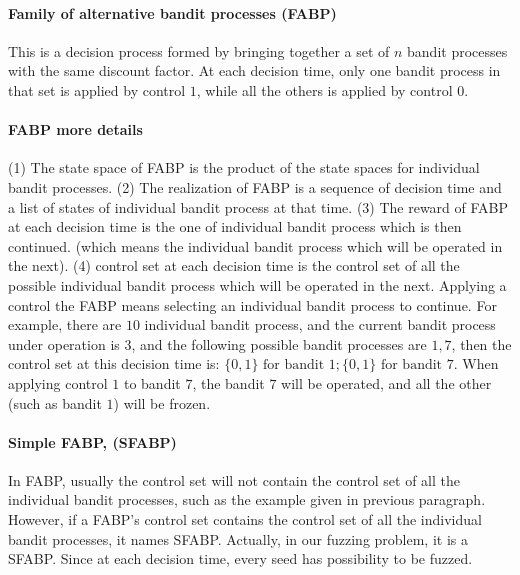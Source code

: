 \paragraph{Family of alternative bandit processes (FABP)}
This is a decision process formed by bringing together a set of $n$ bandit processes with the same 
discount factor. At each decision time, only one bandit process in that set is applied by control $1$,
while all the others is applied by control $0$.

\paragraph{FABP more details}
(1) The state space of FABP is the product of the state spaces for individual bandit processes.
(2) The realization of FABP is a sequence of decision time and a list of states of individual bandit
process at that time. (3) The reward of FABP at each decision time is the one of individual bandit
process which is then continued. (which means the individual bandit process which will be operated
in the next).
(4) control set at each decision time is the control set of all the possible individual bandit process
which will be operated in the next. Applying a control the FABP means selecting an individual bandit
process to continue. For example, there are $10$ individual bandit process, and the current bandit process
under operation is $3$, and the following possible bandit processes are $1,7$, then the control set at 
this decision time is: $\{0,1\} \textrm{ for bandit } 1;  \{0,1\} \textrm{ for bandit } 7$. When applying control $1$
to bandit $7$, the bandit $7$ will be operated, and all the other (such as bandit $1$) will be frozen.

\paragraph{Simple FABP, (SFABP)}
In FABP, usually the control set will not contain  the control set of all the individual bandit processes,
such as the example given in previous paragraph. However, if a FABP's control set contains the control set
of all the individual bandit processes, it names SFABP. Actually, in our fuzzing problem, it is a SFABP.
Since at each decision time, every seed has possibility to be fuzzed.

